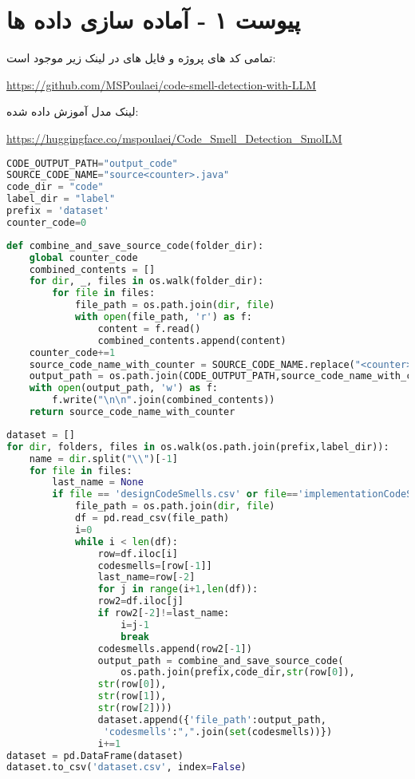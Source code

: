\chapter*{پیوست ۱ - آماده سازی داده ها}

تمامی کد های پروژه و فایل های  در لینک زیر موجود است:
\begin{latin}
	\url{https://github.com/MSPoulaei/code-smell-detection-with-LLM}
\end{latin}
لینک مدل آموزش داده شده:
\begin{latin}
	\url{https://huggingface.co/mspoulaei/Code_Smell_Detection_SmolLM}
\end{latin}

\begin{latin}
	\begin{lstlisting}[language=Python, title=\rl{ثابت ها}]
CODE_OUTPUT_PATH="output_code"
SOURCE_CODE_NAME="source<counter>.java"
code_dir = "code"
label_dir = "label"
prefix = 'dataset'
counter_code=0
\end{lstlisting}
\end{latin}
\begin{latin}
	\begin{lstlisting}[language=Python, title=\rl{تابع ترکیب کردن کد های پروژه جاوا}]
def combine_and_save_source_code(folder_dir):
	global counter_code
	combined_contents = []
	for dir, _, files in os.walk(folder_dir):
		for file in files:
			file_path = os.path.join(dir, file)
			with open(file_path, 'r') as f:
				content = f.read()
				combined_contents.append(content)
	counter_code+=1
	source_code_name_with_counter = SOURCE_CODE_NAME.replace("<counter>",str(counter_code))
	output_path = os.path.join(CODE_OUTPUT_PATH,source_code_name_with_counter)
	with open(output_path, 'w') as f:
		f.write("\n\n".join(combined_contents))
	return source_code_name_with_counter
\end{lstlisting}
\end{latin}

\begin{latin}
	\begin{lstlisting}[language=Python, title=\rl{گردهم آوردن لیبل ها به صورت یکجا برای آموزش}]
dataset = []
for dir, folders, files in os.walk(os.path.join(prefix,label_dir)):
	name = dir.split("\\")[-1]
	for file in files:
		last_name = None
		if file == 'designCodeSmells.csv' or file=='implementationCodeSmells.csv':
			file_path = os.path.join(dir, file)
			df = pd.read_csv(file_path)
			i=0
			while i < len(df):
				row=df.iloc[i]
				codesmells=[row[-1]]
				last_name=row[-2]
				for j in range(i+1,len(df)):
				row2=df.iloc[j]
				if row2[-2]!=last_name:
					i=j-1
					break
				codesmells.append(row2[-1])
				output_path = combine_and_save_source_code(
					os.path.join(prefix,code_dir,str(row[0]),
				str(row[0]),
				str(row[1]),
				str(row[2])))
				dataset.append({'file_path':output_path,
				 'codesmells':",".join(set(codesmells))})
				i+=1
dataset = pd.DataFrame(dataset)
dataset.to_csv('dataset.csv', index=False)
	\end{lstlisting}
\end{latin}


\clearpage